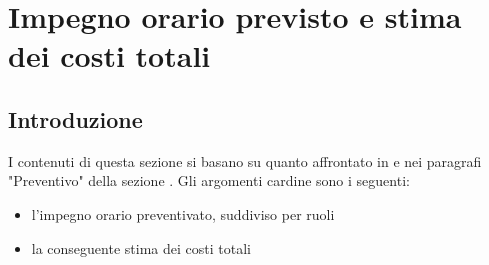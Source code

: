 \documentclass[a4paper,12pt]{article}
\begin{document}

\newpage
\section{Impegno orario previsto e stima dei costi totali}
    \subsection{Introduzione}
        I contenuti di questa sezione si basano su quanto affrontato in \textbf{} e nei paragrafi "Preventivo" della sezione \textbf{}. Gli argomenti cardine sono i seguenti:
        \begin{itemize}
            \item l'impegno orario preventivato, suddiviso per ruoli
            \item la conseguente stima dei costi totali 
        \end{itemize}
\end{document}
